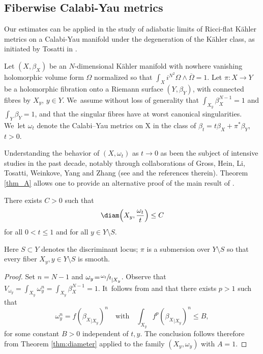 \subsection{Fiberwise Calabi-Yau metrics} \label{sec:ke}

Our estimates can be applied in
the study of adiabatic limits of Ricci-flat Kähler metrics on a Calabi-Yau manifold
under the degeneration of the Kähler class, as initiated by Tosatti in \cite{Tos10}.

Let $(X,\beta_X)$ be an $N$-dimensional Kähler manifold with nowhere vanishing holomorphic volume form $\Omega$
normalized so that $\int_X i^{N^2} \Omega \wedge \overline{\Omega}=1$.
Let $\pi:X \rightarrow Y$ be a holomorphic fibration onto a Riemann surface $(Y,\beta_Y)$, with connected fibres
by $X_y$, $y \in Y$. We~assume without loss of generality that $\int_{X_y} \beta_X^{N-1}=1$ and $\int_Y \beta_Y=1$,
and that the singular fibres have at worst canonical singularities. We~let $\omega_t$ denote the Calabi–Yau metrics on X in the class of
$\beta_t=t\beta_X+ \pi^*\beta_Y$, $t>0$.

Understanding the behavior of $(X,\omega_t)$ as $t \rightarrow 0$ as been the subject of intensive studies
in the past decade, notably through collaborations of
Gross, Hein, Li, Tosatti, Weinkove, Yang and Zhang (see \cite{Tos20} and the references therein).
Theorem \ref{thm_A} allows one to provide an alternative proof of the main result of \cite{Li23}.

\begin{theorem}[{\cite[Th.\,1.4]{Li23}}]
There exists $C>0$ such that
\[
\diam \Bigl(X_y, \frac{\omega_t}{t} \Bigr) \leq C
\]
for all $0<t \leq 1$ and for all $y \in Y\setminus S$.
\end{theorem}

Here $S\subset Y$ denotes the discriminant locus; $\pi$ is a submersion over $Y\setminus S$ so that every fiber $X_y, y\in Y\setminus S$ is smooth.

\begin{proof}
Set $n\!=\!N-1$ and $\omega_y\!=\!{{\sfrac{\omega_t}{t}}}_{|X_y}$.
Observe that $V_{\omega_y}\!=\!\int_{X_y} \omega_y^n\!=\!\int_{X_y} \beta_X^{N-1}\!=\!1$. It~follows from \cite[Prop.\,2.3]{Li23} and \cite[Lem.\,4.4]{DnGG23} that there exists $p>1$ such that
\[
\omega_y^n =f ({\beta_X}_{|X_y})^n
\quad \text{with} \quad
\int_{X_y} f^p ({\beta_X}_{|X_y})^n \leq B,
\]
for some constant $B>0$ independent of $t,y$.
The conclusion follows therefore from Theorem \ref{thm:diameter}
applied to the family $(X_y,\omega_y)$ with $A=1$.
\end{proof}

